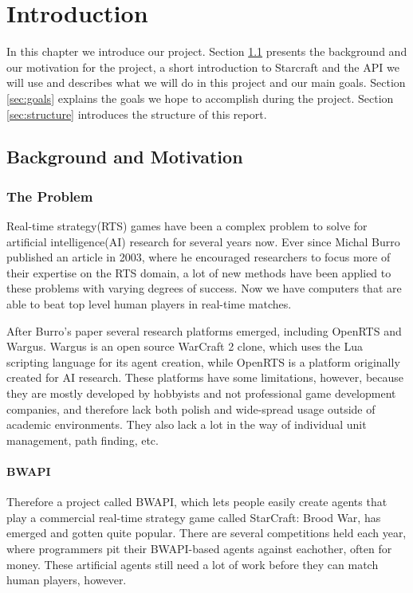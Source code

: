 
\chapter{Introduction}
In this chapter we introduce our project. Section \ref{sec:background} presents the background and our motivation for the project, a short introduction to Starcraft and the API we will use and describes what we will do in this project and our main goals. Section \ref{sec:goals} explains the goals we hope to accomplish during the project. Section \ref{sec:structure} introduces the structure of this report.

\section{Background and Motivation}
\label{sec:background}

\subsection{The Problem}
Real-time strategy(RTS) games have been a complex problem to solve for artificial intelligence(AI) research for several years now. Ever since Michal Burro published an article in 2003\cite{buro2003real}, where he encouraged researchers to focus more of their expertise on the RTS domain, a lot of new methods have been applied to these problems with varying degrees of success. Now we have computers that are able to beat top level human players in real-time matches.\cite{campbell2002deep} 

After Burro's paper several research platforms emerged, including OpenRTS\cite{buro2003orts} and Wargus\cite{wargus}. Wargus is an open source WarCraft 2 clone, which uses the Lua scripting language for its agent creation, while OpenRTS is a platform originally created for AI research. These platforms have some limitations, however, because they are mostly developed by hobbyists and not professional game development companies, and therefore lack both polish and wide-spread usage outside of academic environments. They also lack a lot in the way of individual unit management, path finding, etc.

\subsubsection{BWAPI}
Therefore a project called BWAPI, which lets people easily create agents that play a commercial real-time strategy game called StarCraft: Brood War, has emerged and gotten quite popular.\cite{bwapi} There are several competitions held each year, where programmers pit their BWAPI-based agents against eachother, often for money.\cite{sscait} These artificial agents still need a lot of work before they can match human players, however.\cite{eisbotvsfong}

